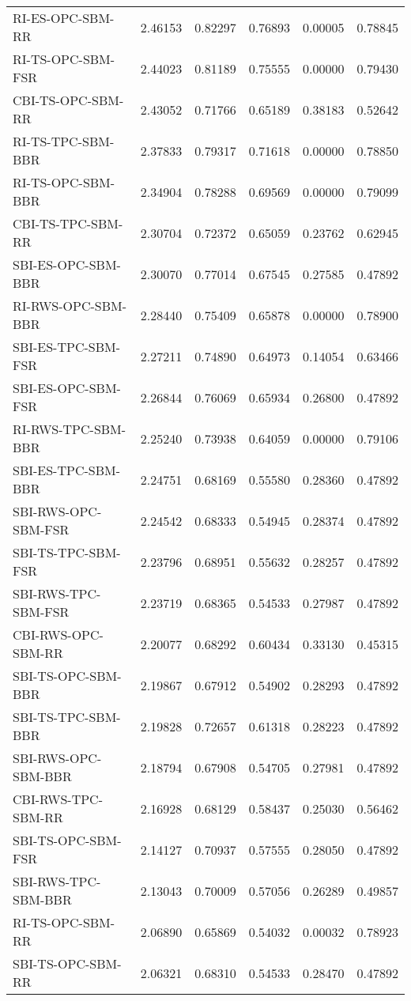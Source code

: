 \begin{tabular}{lrrrrr}
RI-ES-OPC-SBM-RR & 2.46153 & 0.82297 & 0.76893 & 0.00005 & 0.78845 \\
RI-TS-OPC-SBM-FSR & 2.44023 & 0.81189 & 0.75555 & 0.00000 & 0.79430 \\
CBI-TS-OPC-SBM-RR & 2.43052 & 0.71766 & 0.65189 & 0.38183 & 0.52642 \\
RI-TS-TPC-SBM-BBR & 2.37833 & 0.79317 & 0.71618 & 0.00000 & 0.78850 \\
RI-TS-OPC-SBM-BBR & 2.34904 & 0.78288 & 0.69569 & 0.00000 & 0.79099 \\
CBI-TS-TPC-SBM-RR & 2.30704 & 0.72372 & 0.65059 & 0.23762 & 0.62945 \\
SBI-ES-OPC-SBM-BBR & 2.30070 & 0.77014 & 0.67545 & 0.27585 & 0.47892 \\
RI-RWS-OPC-SBM-BBR & 2.28440 & 0.75409 & 0.65878 & 0.00000 & 0.78900 \\
SBI-ES-TPC-SBM-FSR & 2.27211 & 0.74890 & 0.64973 & 0.14054 & 0.63466 \\
SBI-ES-OPC-SBM-FSR & 2.26844 & 0.76069 & 0.65934 & 0.26800 & 0.47892 \\
RI-RWS-TPC-SBM-BBR & 2.25240 & 0.73938 & 0.64059 & 0.00000 & 0.79106 \\
SBI-ES-TPC-SBM-BBR & 2.24751 & 0.68169 & 0.55580 & 0.28360 & 0.47892 \\
SBI-RWS-OPC-SBM-FSR & 2.24542 & 0.68333 & 0.54945 & 0.28374 & 0.47892 \\
SBI-TS-TPC-SBM-FSR & 2.23796 & 0.68951 & 0.55632 & 0.28257 & 0.47892 \\
SBI-RWS-TPC-SBM-FSR & 2.23719 & 0.68365 & 0.54533 & 0.27987 & 0.47892 \\
CBI-RWS-OPC-SBM-RR & 2.20077 & 0.68292 & 0.60434 & 0.33130 & 0.45315 \\
SBI-TS-OPC-SBM-BBR & 2.19867 & 0.67912 & 0.54902 & 0.28293 & 0.47892 \\
SBI-TS-TPC-SBM-BBR & 2.19828 & 0.72657 & 0.61318 & 0.28223 & 0.47892 \\
SBI-RWS-OPC-SBM-BBR & 2.18794 & 0.67908 & 0.54705 & 0.27981 & 0.47892 \\
CBI-RWS-TPC-SBM-RR & 2.16928 & 0.68129 & 0.58437 & 0.25030 & 0.56462 \\
SBI-TS-OPC-SBM-FSR & 2.14127 & 0.70937 & 0.57555 & 0.28050 & 0.47892 \\
SBI-RWS-TPC-SBM-BBR & 2.13043 & 0.70009 & 0.57056 & 0.26289 & 0.49857 \\
RI-TS-OPC-SBM-RR & 2.06890 & 0.65869 & 0.54032 & 0.00032 & 0.78923 \\
SBI-TS-OPC-SBM-RR & 2.06321 & 0.68310 & 0.54533 & 0.28470 & 0.47892 \\

\end{tabular}
